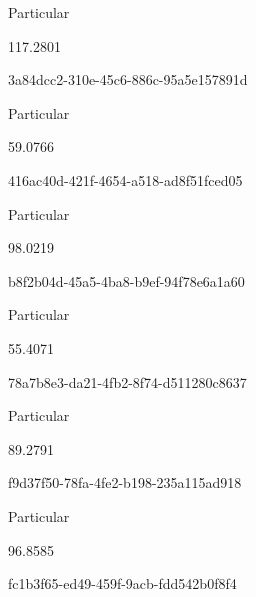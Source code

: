 \documentclass[
  11pt,
  a4paper,
  DIV=11,
  numbers=noendperiod]{scrartcl}
\begin{document}
\n      

Particular

\n      

117.2801

\n    

\n    

\n      

3a84dcc2-310e-45c6-886c-95a5e157891d

\n      

Particular

\n      

59.0766

\n    

\n    

\n      

416ac40d-421f-4654-a518-ad8f51fced05

\n      

Particular

\n      

98.0219

\n    

\n    

\n      

b8f2b04d-45a5-4ba8-b9ef-94f78e6a1a60

\n      

Particular

\n      

55.4071

\n    

\n    

\n      

78a7b8e3-da21-4fb2-8f74-d511280c8637

\n      

Particular

\n      

89.2791

\n    

\n    

\n      

f9d37f50-78fa-4fe2-b198-235a115ad918

\n      

Particular

\n      

96.8585

\n    

\n    

\n      

fc1b3f65-ed49-459f-9acb-fdd542b0f8f4

\n      
\end{document}

